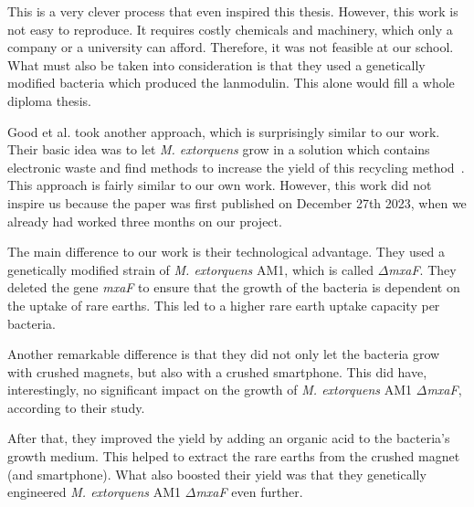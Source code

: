 This is a very clever process that even inspired this thesis.
However, this work is not easy to reproduce.
It requires costly chemicals and machinery, which only a company or a university can afford.
Therefore, it was not feasible at our school.
What must also be taken into consideration is that they used a genetically modified bacteria which produced the lanmodulin.
This alone would fill a whole diploma thesis.

\newpage

Good et al. took another approach, which is surprisingly similar to our work.
Their basic idea was to let \emph{M. extorquens} grow in a solution which contains electronic waste and find methods to increase the yield of this recycling method~\cite{similarwork}.
This approach is fairly similar to our own work.
However, this work did not inspire us because the paper was first published on December 27th 2023, when we already had worked three months on our project.

The main difference to our work is their technological advantage.
They used a genetically modified strain of \emph{M. extorquens} AM1, which is called \(\Delta\)\emph{mxaF}.
They deleted the gene \emph{mxaF} to ensure that the growth of the bacteria is dependent on the uptake of rare earths.
This led to a higher rare earth uptake capacity per bacteria.

Another remarkable difference is that they did not only let the bacteria grow with crushed magnets, but also with a crushed smartphone.
This did have, interestingly, no significant impact on the growth of \emph{M. extorquens} AM1 \(\Delta\)\emph{mxaF}, according to their study.

After that, they improved the yield by adding an organic acid to the bacteria's growth medium.
This helped to extract the rare earths from the crushed magnet (and smartphone).
What also boosted their yield was that they genetically engineered \emph{M. extorquens} AM1 \(\Delta\)\emph{mxaF} even further.
